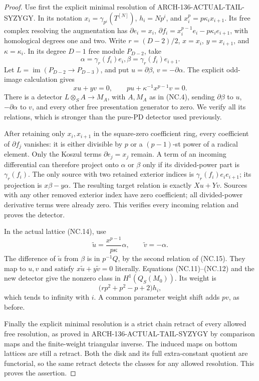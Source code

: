 \begin{proof}
Use first the explicit minimal resolution of
ARCH-136-ACTUAL-TAIL-SYZYGY.  In its notation
\(x_i=\gamma_{p^i}(T^{[N]})\), \(h_i=Np^i\), and
\(x_i^p=p\kappa_i x_{i+1}\).  Its free complex resolving the
augmentation has
\(\partial e_i=x_i\),
\(\partial f_i=x_i^{p-1}e_i-p\kappa_i e_{i+1}\), with
homological degrees one and two.  Write
\(r=(D-2)/2\), \(x=x_i\), \(y=x_{i+1}\), and
\(\kappa=\kappa_i\).  In its degree \(D-1\) free module
\(P_{D-2}\), take
\[
             \alpha=\gamma_r(f_i)e_i,
             \beta=\gamma_r(f_i)e_{i+1}.
\]
Let \(L=\operatorname{im}(P_{D-2}\to P_{D-3})\), and put
\(u=\partial\beta\), \(v=-\partial\alpha\).  The explicit
odd-image calculation gives
\[
                   xu+yv=0,
            \qquad pu+\kappa^{-1}x^{p-1}v=0.             \tag{NC.15}
\]
There is a detector \(L\otimes_S A\to M_A\), with \(A,M_A\)
as in (NC.4), sending \(\partial\beta\) to \(u\),
\(-\partial\alpha\) to \(v\), and every other free
presentation generator to zero.  We verify all its relations,
which is stronger than the pure-PD detector used previously.

After retaining only \(x_i,x_{i+1}\) in the square-zero
coefficient ring, every coefficient of \(\partial f_j\)
vanishes: it is either divisible by \(p\) or a
\((p-1)\)-st power of a radical element.  Only the Koszul
terms \(\partial e_j=x_j\) remain.  A term of an incoming
differential can therefore project onto \(\alpha\) or
\(\beta\) only if its divided-power part is
\(\gamma_r(f_i)\).  The only source with two retained
exterior indices is
\(\gamma_r(f_i)e_ie_{i+1}\); its projection is
\(x\beta-y\alpha\).  The resulting target relation is
exactly \(Xu+Yv\).  Sources with any other removed exterior
index have zero coefficient; all divided-power derivative
terms were already zero.  This verifies every incoming
relation and proves the detector.

In the actual lattice (NC.14), use
\[
       \widetilde u=\frac{x^{p-1}}{p\kappa}\alpha,
                 \qquad \widetilde v=-\alpha.            \tag{NC.16}
\]
The difference of \(\widetilde u\) from \(\beta\) is
in \(p^{-1}Q\), by the second relation of (NC.15).
They map to \(u,v\) and satisfy
\(x\widetilde u+y\widetilde v=0\) literally.
Equations (NC.11)--(NC.12) and the new detector give the
nonzero class in \(H^1(Q_S(M_0))\).  Its weight is
\[
               \bigl(rp^2+p^2-p+2\bigr)h_i,             \tag{NC.17}
\]
which tends to infinity with \(i\).  A common parameter
weight shift adds \(pv\), as before.

Finally the explicit minimal resolution is a strict chain
retract of every allowed free resolution, as proved in
ARCH-136-ACTUAL-TAIL-SYZYGY by comparison maps and the finite-weight
triangular inverse.  The induced maps on bottom lattices are
still a retract.  Both the disk and its full extra-constant
quotient are functorial, so the same retract detects the
classes for any allowed resolution.  This proves the assertion.
\end{proof}

